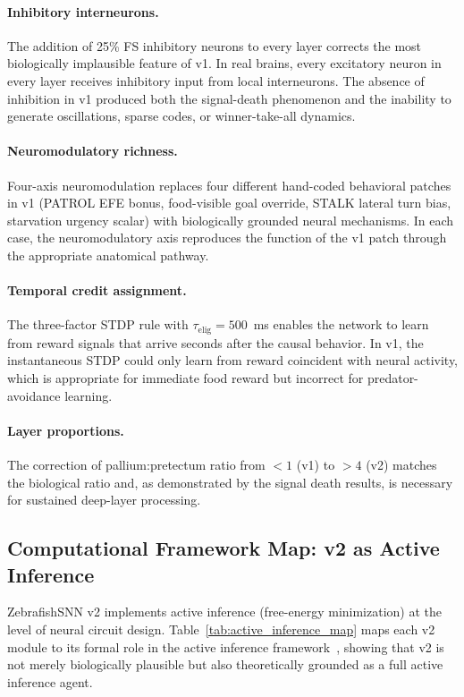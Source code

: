 \documentclass[11pt,a4paper]{article}
\begin{document}
\paragraph{Inhibitory interneurons.}
The addition of 25\% FS inhibitory neurons to every layer corrects
the most biologically implausible feature of v1.
In real brains, every excitatory neuron in every layer receives
inhibitory input from local interneurons.
The absence of inhibition in v1 produced both the signal-death
phenomenon and the inability to generate oscillations, sparse codes,
or winner-take-all dynamics.

\paragraph{Neuromodulatory richness.}
Four-axis neuromodulation replaces four different hand-coded behavioral
patches in v1 (PATROL EFE bonus, food-visible goal override, STALK
lateral turn bias, starvation urgency scalar) with biologically grounded
neural mechanisms.
In each case, the neuromodulatory axis reproduces the function of
the v1 patch through the appropriate anatomical pathway.

\paragraph{Temporal credit assignment.}
The three-factor STDP rule with $\tau_\mathrm{elig} = 500$~ms
enables the network to learn from reward signals that arrive seconds
after the causal behavior.
In v1, the instantaneous STDP could only learn from reward coincident
with neural activity, which is appropriate for immediate food reward
but incorrect for predator-avoidance learning.

\paragraph{Layer proportions.}
The correction of pallium:pretectum ratio from $< 1$ (v1) to $> 4$
(v2) matches the biological ratio and, as demonstrated by the signal
death results, is necessary for sustained deep-layer processing.

\subsection{Computational Framework Map: v2 as Active Inference}\label{sec:framework_map}

ZebrafishSNN v2 implements active inference (free-energy minimization)
at the level of neural circuit design.
Table~\ref{tab:active_inference_map} maps each v2 module to its
formal role in the active inference framework~\cite{friston2010},
showing that v2 is not merely biologically plausible but also
theoretically grounded as a full active inference agent.
\end{document}
